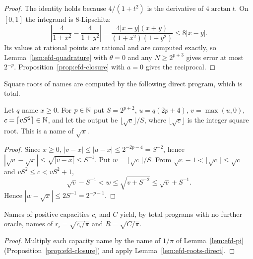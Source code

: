\begin{proof}
The identity holds because $4/(1+t^2)$ is the derivative of $4\arctan t$. On $[0,1]$ the integrand is
$8$-Lipschitz:
\[
 \left|\frac4{1+x^2}-\frac4{1+y^2}\right|
 =\frac{4|x-y|(x+y)}{(1+x^2)(1+y^2)}\le8|x-y|.
\]
Its values at rational points are rational and are computed exactly, so Lemma~\ref{lem:efd-quadrature} with
$\theta=0$ and any $N\ge2^{p+3}$ gives error at most $2^{-p}$. Proposition~\ref{prop:efd-closure} with $a=0$ gives the reciprocal.
\end{proof}

Square roots of names are computed by the following direct program, which is total.

\begin{lemma}\label{lem:efd-roots-direct}
Let $q$ name $x\ge0$. For $p\in\mathbb{N}$ put $S=2^{p+2}$, $u=q(2p+4)$, $v=\max(u,0)$, $c=\lceil vS^2\rceil\in\mathbb{N}$, and
let the output be $\lfloor\sqrt c\rfloor/S$, where $\lfloor\sqrt c\rfloor$ is the integer square root. This is a name
of $\sqrt x$.
\end{lemma}

\begin{proof}
Since $x\ge0$, $|v-x|\le|u-x|\le2^{-2p-4}=S^{-2}$, hence $|\sqrt v-\sqrt x|\le\sqrt{|v-x|}\le S^{-1}$. Put
$w=\lfloor\sqrt c\rfloor/S$. From $\sqrt c-1<\lfloor\sqrt c\rfloor\le\sqrt c$ and $vS^2\le c<vS^2+1$,
\[
 \sqrt v-S^{-1}<w\le\sqrt{v+S^{-2}}\le\sqrt v+S^{-1}.
\]
Hence $|w-\sqrt x|\le2S^{-1}=2^{-p-1}$.
\end{proof}

\begin{corollary}\label{thm:efd-radii}
Names of positive capacities $c_i$ and $C$ yield, by total programs with no further oracle, names of
$r_i=\sqrt{c_i/\pi}$ and $R=\sqrt{C/\pi}$.
\end{corollary}

\begin{proof}
Multiply each capacity name by the name of $1/\pi$ of Lemma~\ref{lem:efd-pi} (Proposition~\ref{prop:efd-closure})
and apply Lemma~\ref{lem:efd-roots-direct}.
\end{proof}

